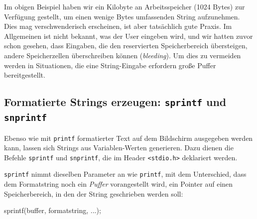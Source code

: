 \begin{warnbox}
Im obigen Beispiel haben wir ein Kilobyte an Arbeitsspeicher (1024 Bytes) zur Verfügung gestellt, um einen wenige Bytes umfassenden String aufzunehmen. Dies mag verschwenderisch erscheinen, ist aber tatsächlich gute Praxis. Im Allgemeinen ist nicht bekannt, was der User eingeben wird, und wir hatten zuvor schon gesehen, dass Eingaben, die den reservierten Speicherbereich übersteigen, andere Speicherzellen überschreiben können (\emph{bleeding}). Um dies zu vermeiden werden in Situationen, die eine String-Eingabe erfordern große Puffer bereitgestellt.
\end{warnbox}


\subsection{Formatierte Strings erzeugen: \texttt{sprintf} und \texttt{snprintf}}
Ebenso wie mit \texttt{printf} formatierter Text auf dem Bildschirm ausgegeben werden kann, lassen sich Strings aus Variablen-Werten generieren. Dazu dienen die Befehle \texttt{sprintf} und \texttt{snprintf}, die im Header \texttt{<stdio.h>} deklariert werden.

\texttt{sprintf} nimmt dieselben Parameter an wie \texttt{printf}, mit dem Unterschied, dass dem Formatstring noch ein \emph{Puffer} vorangestellt wird, \ie ein Pointer auf einen Speicherbereich, in den der String geschrieben werden soll:
\begin{codebox}
sprintf(buffer, formatstring, ...);
\end{codebox}

